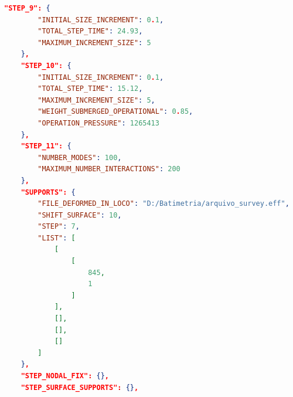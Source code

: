 \begin{lstlisting}[firstnumber=173, language=json, label={tab:jdsn-arquivojson6}, caption={Exemplo de arquivo de entrada de dados - Parte 6/7}]
    "STEP_9": {
        "INITIAL_SIZE_INCREMENT": 0.1,
        "TOTAL_STEP_TIME": 24.93,
        "MAXIMUM_INCREMENT_SIZE": 5
    },
    "STEP_10": {
        "INITIAL_SIZE_INCREMENT": 0.1,
        "TOTAL_STEP_TIME": 15.12,
        "MAXIMUM_INCREMENT_SIZE": 5,
        "WEIGHT_SUBMERGED_OPERATIONAL": 0.85,
        "OPERATION_PRESSURE": 1265413
    },
    "STEP_11": {
        "NUMBER_MODES": 100,
        "MAXIMUM_NUMBER_INTERACTIONS": 200
    },
    "SUPPORTS": {
        "FILE_DEFORMED_IN_LOCO": "D:/Batimetria/arquivo_survey.eff",
        "SHIFT_SURFACE": 10,
        "STEP": 7,
        "LIST": [
            [
                [
                    845,
                    1
                ]
            ],
            [],
            [],
            []
        ]
    },
    "STEP_NODAL_FIX": {},
    "STEP_SURFACE_SUPPORTS": {},
\end{lstlisting}

